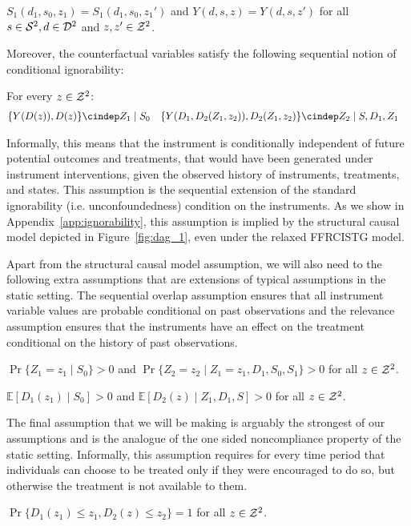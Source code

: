 \begin{assumption}
[Exclusion]\label{assume:2_exclusion}
$S_1(d_1, s_0, z_1)=S_1(d_1, s_0, z_1')$ and
$Y(d, s, z)=Y(d, s, z')$
for all $s\in {\cal S}^2,d\in {\cal D}^2$ and $z,z'\in {\cal Z}^2$.
\end{assumption}
\noindent 
Moreover, the counterfactual variables satisfy the following sequential notion of conditional ignorability:
\begin{assumption}\label{assume:2_ignorability}
For every $z\in {\cal Z}^2$:
\begin{align*}
    \{Y(D(z)), D(z)\} \cindep& Z_1 \mid S_0 & 
    \{Y(D_1, D_2(Z_1, z_2)), D_2(Z_1, z_2)\} \cindep& Z_2 \mid S, D_1, Z_1
\end{align*}
\end{assumption}
\noindent 
Informally, this means that the instrument is conditionally independent of future potential outcomes and treatments, that would have been generated under instrument interventions, given the observed history of instruments, treatments, and states.
This assumption is the sequential extension of the standard ignorability (i.e. unconfoundedness) condition on the instruments. As we show in Appendix~\ref{app:ignorability}, this assumption is implied by the structural causal model depicted in Figure~\ref{fig:dag_1}, even under the relaxed FFRCISTG model.

Apart from the structural causal model assumption, we will also need to the following extra assumptions that are extensions of typical assumptions in the static setting. The sequential overlap assumption ensures that all instrument variable values are probable conditional on past observations and the relevance assumption ensures that the instruments have an effect on the treatment conditional on the history of past observations.
\begin{assumption}\label{assume:2_overlap}
$\Pr\{Z_1 = z_1 \mid S_0\} > 0$ and $\Pr\{Z_2=z_2 \mid Z_1=z_1, D_1, S_0, S_1\} > 0$ for all $z\in {\cal Z}^2$.
\end{assumption}

\begin{assumption}\label{assume:2_relevance}
$\mathbb{E}[D_1(z_1) \mid S_0] > 0$ and
$\mathbb{E}[D_2(z) \mid Z_1, D_1, S] > 0$ 
for all $z\in {\cal Z}^2$.
\end{assumption}

The final assumption that we will be making is arguably the strongest of our assumptions and is the analogue of the one sided noncompliance property of the static setting. 
Informally, this assumption requires for every time period that individuals can choose to be treated only if they were encouraged to do so, but  otherwise the treatment is not available to them.
\begin{assumption}\label{assume:2_one_sided}
$\Pr\{D_1(z_1) \leq z_1, D_2(z) \leq z_2\}=1$ for all $z\in {\cal Z}^2$.
\end{assumption}


